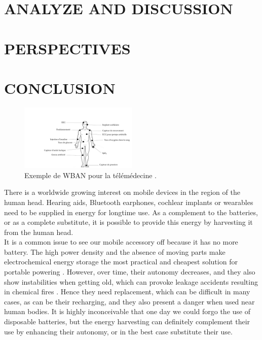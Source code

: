 \documentclass[3p,twocolumn,preprint]{elsarticle}
\begin{document}
\section{ANALYZE AND DISCUSSION}
\label{DISCUSSION}

\section{PERSPECTIVES}
\label{PERSPECTIVES}

\section{CONCLUSION}
\label{CONCLUSION}

\begin{figure}[!htbp]
	\centering
	\captionsetup{justification=centering}
	\includegraphics[trim={6cm 0cm 0cm 4cm},clip, width=0.5\textwidth]{figures/capteurs_corps_humain.pdf}
	\caption{Exemple de WBAN pour la télémédecine \cite{Abidi2020}.}
	\label{fig:capteurs_corps_humain}
\end{figure}


There is a worldwide growing interest on mobile devices in the region of the human head. Hearing aids, Bluetooth earphones, cochlear implants or wearables need to be supplied in energy for longtime use. As a complement to the batteries, or as a complete substitute, it is possible to provide this energy by harvesting it from the human head.\\
It is a common issue to see our mobile accessory off because it has no more battery. The high power density and the absence of moving parts make electrochemical energy storage the most practical and cheapest solution for portable powering \cite{Jiang2020}. However, over time, their autonomy decreases, and they also show instabilities when getting old, which can provoke leakage accidents resulting in chemical fires \cite{Tian2020}. Hence they need replacement, which can be difficult in many cases, as can be their recharging, and they also present a danger when used near human bodies. It is highly inconceivable that one day we could forgo the use of disposable batteries, but the energy harvesting can definitely complement their use by enhancing their autonomy, or in the best case substitute their use. 
\end{document}
